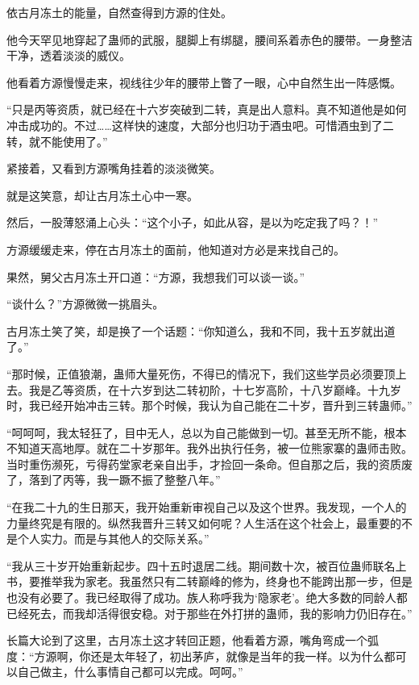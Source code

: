 
\begin{this_body}

依古月冻土的能量，自然查得到方源的住处。

他今天罕见地穿起了蛊师的武服，腿脚上有绑腿，腰间系着赤色的腰带。一身整洁干净，透着淡淡的威仪。

他看着方源慢慢走来，视线往少年的腰带上瞥了一眼，心中自然生出一阵感慨。

“只是丙等资质，就已经在十六岁突破到二转，真是出人意料。真不知道他是如何冲击成功的。不过……这样快的速度，大部分也归功于酒虫吧。可惜酒虫到了二转，就不能使用了。”

紧接着，又看到方源嘴角挂着的淡淡微笑。

就是这笑意，却让古月冻土心中一寒。

然后，一股薄怒涌上心头：“这个小子，如此从容，是以为吃定我了吗？！”

方源缓缓走来，停在古月冻土的面前，他知道对方必是来找自己的。

果然，舅父古月冻土开口道：“方源，我想我们可以谈一谈。”

“谈什么？”方源微微一挑眉头。

古月冻土笑了笑，却是换了一个话题：“你知道么，我和不同，我十五岁就出道了。”

“那时候，正值狼潮，蛊师大量死伤，不得已的情况下，我们这些学员必须要顶上去。我是乙等资质，在十六岁到达二转初阶，十七岁高阶，十八岁巅峰。十九岁时，我已经开始冲击三转。那个时候，我认为自己能在二十岁，晋升到三转蛊师。”

“呵呵呵，我太轻狂了，目中无人，总以为自己能做到一切。甚至无所不能，根本不知道天高地厚。就在二十岁那年。我外出执行任务，被一位熊家寨的蛊师击败。当时重伤濒死，亏得药堂家老亲自出手，才捡回一条命。但自那之后，我的资质废了，落到了丙等，我一蹶不振了整整八年。”

“在我二十九的生日那天，我开始重新审视自己以及这个世界。我发现，一个人的力量终究是有限的。纵然我晋升三转又如何呢？人生活在这个社会上，最重要的不是个人实力。而是与其他人的交际关系。”

“我从三十岁开始重新起步。四十五时退居二线。期间数十次，被百位蛊师联名上书，要推举我为家老。我虽然只有二转巅峰的修为，终身也不能跨出那一步，但是也没有必要了。我已经取得了成功。族人称呼我为‘隐家老’。绝大多数的同龄人都已经死去，而我却活得很安稳。对于那些在外打拼的蛊师，我的影响力仍旧存在。”

长篇大论到了这里，古月冻土这才转回正题，他看着方源，嘴角弯成一个弧度：“方源啊，你还是太年轻了，初出茅庐，就像是当年的我一样。以为什么都可以自己做主，什么事情自己都可以完成。呵呵。”


\end{this_body}
